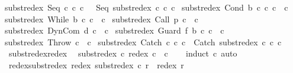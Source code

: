 \begin{isabellebody}
{\isachardoublequoteopen}subst{\isacharunderscore}redex\ {\isacharparenleft}Seq\ c\ c\ c\ \ {\isacharequal}\ Seq\ {\isacharparenleft}subst{\isacharunderscore}redex\ c\ c{\isacharparenright}\ c\ {\isacharbar}\isanewline
{\isachardoublequoteopen}subst{\isacharunderscore}redex\ {\isacharparenleft}Cond\ b\ c\ c\ c\ {\isacharequal}\ c{\isachardoublequoteclose}\ {\isacharbar}\isanewline
{\isachardoublequoteopen}subst{\isacharunderscore}redex\ {\isacharparenleft}While\ b\ c{\isacharprime}{\isacharparenright}\ c\ {\isacharequal}\ c{\isachardoublequoteclose}\ {\isacharbar}\isanewline
{\isachardoublequoteopen}subst{\isacharunderscore}redex\ {\isacharparenleft}Call\ p{\isacharparenright}\ c\ {\isacharequal}\ c{\isachardoublequoteclose}\ {\isacharbar}\isanewline
{\isachardoublequoteopen}subst{\isacharunderscore}redex\ {\isacharparenleft}DynCom\ d{\isacharparenright}\ c\ {\isacharequal}\ c{\isachardoublequoteclose}\ {\isacharbar}\isanewline
{\isachardoublequoteopen}subst{\isacharunderscore}redex\ {\isacharparenleft}Guard\ f\ b\ c{\isacharprime}{\isacharparenright}\ c\ {\isacharequal}\ c{\isachardoublequoteclose}\ {\isacharbar}\isanewline
{\isachardoublequoteopen}subst{\isacharunderscore}redex\ {\isacharparenleft}Throw{\isacharparenright}\ c\ {\isacharequal}\ c{\isachardoublequoteclose}\ {\isacharbar}\isanewline
{\isachardoublequoteopen}subst{\isacharunderscore}redex\ {\isacharparenleft}Catch\ c\ c\ c\ {\isacharequal}\ Catch\ {\isacharparenleft}subst{\isacharunderscore}redex\ c\ c{\isacharparenright}\ c\isanewline
\isanewline
{}\isamarkupfalse%
\ subst{\isacharunderscore}redex{\isacharunderscore}redex{\isacharcolon}\isanewline
\ \ {\isachardoublequoteopen}subst{\isacharunderscore}redex\ c\ {\isacharparenleft}redex\ c{\isacharparenright}\ {\isacharequal}\ c{\isachardoublequoteclose}\isanewline
%
\isadelimproof
\ \ %
\endisadelimproof
%
\isatagproof
{}\isamarkupfalse%
\ {\isacharparenleft}induct\ c{\isacharparenright}\ auto%
\endisatagproof
{\isafoldproof}%
%
\isadelimproof
\isanewline
%
\endisadelimproof
\isanewline
{}\isamarkupfalse%
\ redex{\isacharunderscore}subst{\isacharunderscore}redex{\isacharcolon}\ {\isachardoublequoteopen}redex\ {\isacharparenleft}subst{\isacharunderscore}redex\ c\ r{\isacharparenright}\ {\isacharequal}\ redex\ r{\isachardoublequoteclose}\isanewline

\end{isabellebody}
